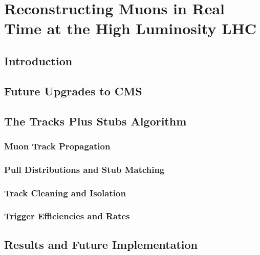 
\chapter{Reconstructing Muons in Real Time at the High Luminosity LHC}
\label{chap:TPSAppendix}

\section{Introduction}

\section{Future Upgrades to CMS}
\label{sec:CMSUpgrade}

\section{The Tracks Plus Stubs Algorithm}
\label{sec:TPS}

\subsection{Muon Track Propagation}
\label{subsec:prop}

\subsection{Pull Distributions and Stub Matching}
\label{subsec:pulls}

\subsection{Track Cleaning and Isolation}
\label{subsec:cleaning}

\subsection{Trigger Efficiencies and Rates}
\label{subsec:rates}

\section{Results and Future Implementation}
\label{subsec:TPSResults}

